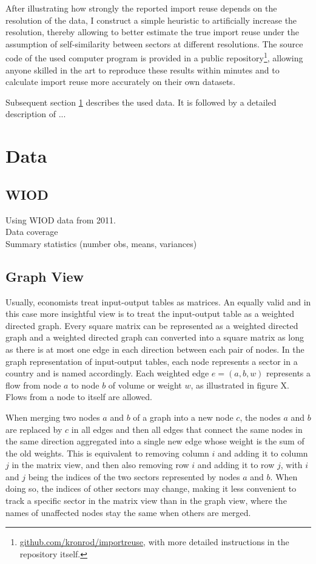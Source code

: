 \documentclass[english]{uzhpub}
\begin{document}
After illustrating how strongly the reported import reuse depends on the resolution of the data, I construct a simple heuristic to artificially increase the resolution, thereby allowing to better estimate the true import reuse under the assumption of self-similarity between sectors at different resolutions. The source code of the used computer program is provided in a public repository\footnote{\href{https://github.com/kronrod/importreuse}{github.com/kronrod/importreuse}, with more detailed instructions in the repository itself.}, allowing anyone skilled in the art to reproduce these results within minutes and to calculate import reuse more accurately on their own datasets.

Subsequent section \ref{sec:data} describes the used data. It is followed by a detailed description of ...


\section{Data}
\label{sec:data}
\subsection{WIOD}
Using WIOD data from 2011.\\
Data coverage\\
Summary statistics (number obs, means, variances)\\
\subsection{Graph View}
\label{sec:graphview}
Usually, economists treat input-output tables as matrices. An equally valid and in this case more insightful view is to treat the input-output table as a weighted directed graph. Every square matrix can be represented as a weighted directed graph and a weighted directed graph can converted into a square matrix as long as there is at most one edge in each direction between each pair of nodes. In the graph representation of input-output tables, each node represents a sector in a country and is named accordingly. Each weighted edge $e=(a, b, w)$ represents a flow from node $a$ to node $b$ of volume or weight $w$, as illustrated in figure X. Flows from a node to itself are allowed.

When merging two nodes $a$ and $b$ of a graph into a new node $c$, the nodes $a$ and $b$ are replaced by $c$ in all edges and then all edges that connect the same nodes in the same direction aggregated into a single new edge whose weight is the sum of the old weights. This is equivalent to removing column $i$ and adding it to column $j$ in the matrix view, and then also removing row $i$ and adding it to row $j$, with $i$ and $j$ being the indices of the two sectors represented by nodes $a$ and $b$. When doing so, the indices of other sectors may change, making it less convenient to track a specific sector in the matrix view than in the graph view, where the names of unaffected nodes stay the same when others are merged.
\end{document}
